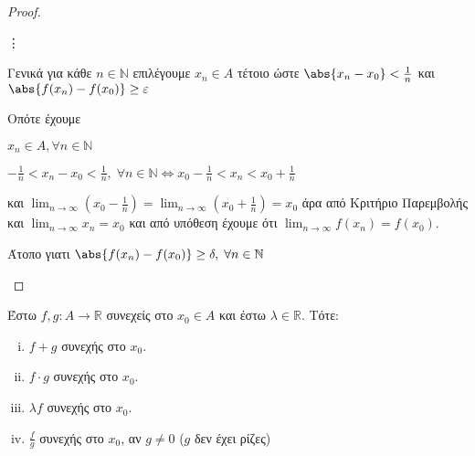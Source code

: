 \documentclass[main.tex]{subfiles}
\begin{document}
\begin{proof}
\begin{description}
\begin{myitemize}
                \hspace{0.2\textwidth} \vdots 
            \end{myitemize}
            Γενικά για κάθε $ n \in \mathbb{N} $ επιλέγουμε $ x_{n} \in A $ 
            τέτοιο ώστε $ \abs{x_{n}- x_{0}} < \frac{1}{n} $ και 
            $ \abs{f(x_{n}) - f(x_{0})} \geq \varepsilon  $

            Οπότε έχουμε
            \begin{myitemize}
            \item $ x_{n} \in A, \forall n \in \mathbb{N} $ 
            \item $ - \frac{1}{n} < x_{n} - x_{0} < \frac{1}{n}, \; 
                \forall n \in \mathbb{N} 
                \Leftrightarrow x_{0}- \frac{1}{n} < x_{n} < x_{0}+ \frac{1}{n} $ 
            \end{myitemize}
            και $ \lim_{n \to \infty} (x_{0}- \frac{1}{n}) = 
            \lim_{n \to \infty} (x_{0}+ \frac{1}{n}) = x_{0} $ άρα από Κριτήριο 
            Παρεμβολής και $ \lim_{n \to \infty} x_{n} = x_{0} $ και από υπόθεση 
            έχουμε ότι $ \lim_{n \to \infty} f(x_{n}) = f(x_{0}) $.

            Άτοπο γιατι $ \abs{f(x_{n})- f(x_{0})} \geq \delta, 
            \; \forall n \in \mathbb{N}$
    \end{description}
\end{proof}

\begin{prop}
    Έστω $ f,g \colon A \to \mathbb{R} $ συνεχείς στο $ x_{0} \in A $ και έστω 
    $ \lambda \in \mathbb{R} $. Τότε:
    \begin{enumerate}[i)]
        \item $ f+g $ συνεχής στο $ x_{0} $.
        \item $ f\cdot g $ συνεχής στο $ x_{0} $.
        \item $ \lambda f $ συνεχής στο $ x_{0} $.
        \item $ \frac{f}{g} $ συνεχής στο $ x_{0} $, αν $g \neq 0$ ($g$ δεν έχει
            ρίζες) 
    \end{enumerate}
\end{prop}
\end{document}
